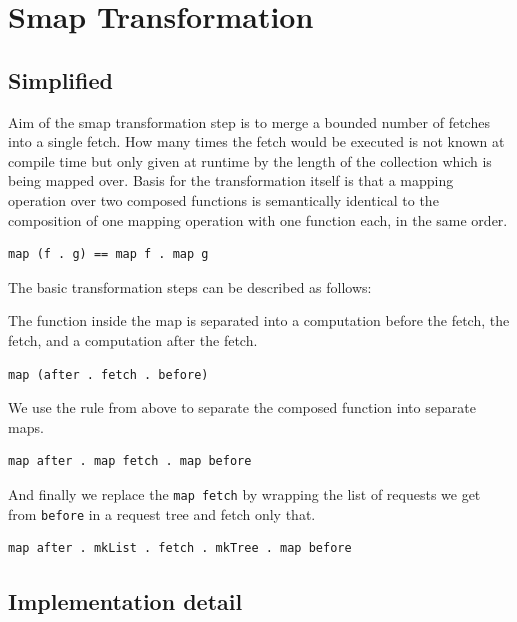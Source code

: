\chapter{Smap Transformation}

\label{ch:smap-transformation}

\section{Simplified}

Aim of the smap transformation step is to merge a bounded number of fetches into a single fetch.
How many times the fetch would be executed is not known at compile time but only given at runtime by the length of the collection which is being mapped over.
Basis for the transformation itself is that a mapping operation over two composed functions is semantically identical to the composition of one mapping operation with one function each, in the same order.

\begin{verbatim}
map (f . g) == map f . map g
\end{verbatim}

The basic transformation steps can be described as follows:

The function inside the map is separated into a computation before the fetch, the fetch, and a computation after the fetch.

\begin{verbatim}
map (after . fetch . before)
\end{verbatim}

We use the rule from above to separate the composed function into separate maps.

\begin{verbatim}
map after . map fetch . map before
\end{verbatim}

And finally we replace the \texttt{map fetch} by wrapping the list of requests we get from \texttt{before} in a request tree and fetch only that.

\begin{verbatim}
map after . mkList . fetch . mkTree . map before
\end{verbatim}

\section{Implementation detail}

